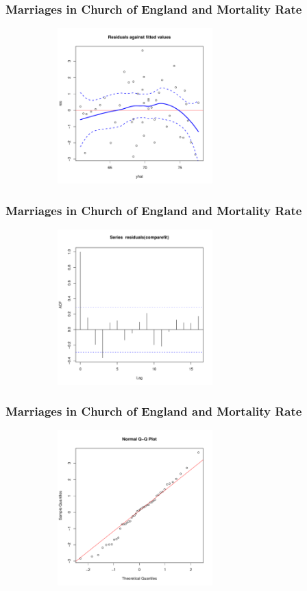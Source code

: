 \documentclass[%
xcolor=pdftex]{beamer}
\begin{document}
\begin{frame}
\frametitle{Marriages in Church of England and Mortality Rate}

\includegraphics[width=100mm, height=60mm]{pics/residcomparefit.pdf}

\end{frame}

\begin{frame}
\frametitle{Marriages in Church of England and Mortality Rate}


\includegraphics[width=100mm, height=60mm]{pics/acfcomparefit.pdf}

\end{frame}

\begin{frame}
\frametitle{Marriages in Church of England and Mortality Rate}

\includegraphics[width=100mm, height=60mm]{pics/qqnormcomparefit.pdf}

\end{frame}
\end{document}
